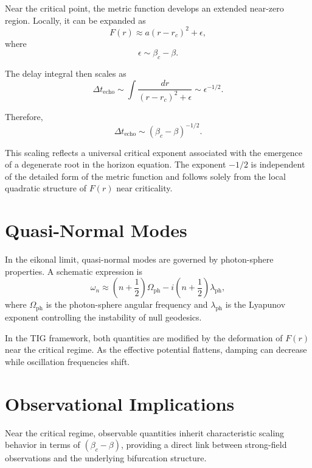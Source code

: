 \documentclass[11pt,a4paper]{article}
\begin{document}
Near the critical point, the metric function develops an extended near-zero region. Locally, it can be expanded as
\begin{equation}
F(r)
\approx
 a(r-r_c)^2 + \epsilon ,
\end{equation}
where
\begin{equation}
\epsilon \sim \beta_c - \beta .
\end{equation}

The delay integral then scales as
\begin{equation}
\Delta t_{\mathrm{echo}}
\sim
\int
\frac{dr}{(r-r_c)^2+\epsilon}
\sim
\epsilon^{-1/2}.
\end{equation}

Therefore,
\begin{equation}
\Delta t_{\mathrm{echo}}
\sim
(\beta_c-\beta)^{-1/2}.
\end{equation}

This scaling reflects a universal critical exponent associated with the emergence of a degenerate root in the horizon equation. The exponent $-1/2$ is independent of the detailed form of the metric function and follows solely from the local quadratic structure of $F(r)$ near criticality.

\section{Quasi-Normal Modes}

In the eikonal limit, quasi-normal modes are governed by photon-sphere properties. A schematic expression is
\begin{equation}
\omega_n
\approx
\left(n+\frac{1}{2}\right)\Omega_{\mathrm{ph}}
-
i
\left(n+\frac{1}{2}\right)\lambda_{\mathrm{ph}},
\end{equation}
where $\Omega_{\mathrm{ph}}$ is the photon-sphere angular frequency and $\lambda_{\mathrm{ph}}$ is the Lyapunov exponent controlling the instability of null geodesics.

In the TIG framework, both quantities are modified by the deformation of $F(r)$ near the critical regime. As the effective potential flattens, damping can decrease while oscillation frequencies shift.

\section{Observational Implications}

Near the critical regime, observable quantities inherit characteristic scaling behavior in terms of $(\beta_c-\beta)$, providing a direct link between strong-field observations and the underlying bifurcation structure.
\end{document}
